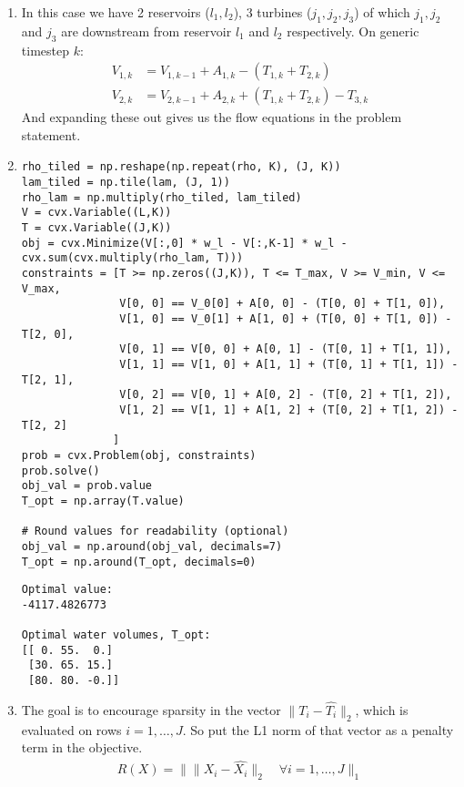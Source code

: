 \documentclass[11pt]{article}
\begin{document}
\begin{solution}
\begin{enumerate}
    \item In this case we have 2 reservoirs ($l_1, l_2$), 3 turbines ($j_1, j_2, j_3$) of which $j_1, j_2$ and $j_3$ are downstream from reservoir $l_1$ and $l_2$ respectively. On generic timestep $k$:
    \begin{align*}
        V_{1,k} &= V_{1,k-1} + A_{1,k} - (T_{1,k} + T_{2,k}) \\
        V_{2,k} &= V_{2,k-1} + A_{2,k} + (T_{1,k} + T_{2,k}) - T_{3,k}
    \end{align*}
    And expanding these out gives us the flow equations in the problem statement.

    \item
    \begin{verbatim}
rho_tiled = np.reshape(np.repeat(rho, K), (J, K))
lam_tiled = np.tile(lam, (J, 1))
rho_lam = np.multiply(rho_tiled, lam_tiled)
V = cvx.Variable((L,K))
T = cvx.Variable((J,K))
obj = cvx.Minimize(V[:,0] * w_l - V[:,K-1] * w_l - cvx.sum(cvx.multiply(rho_lam, T)))
constraints = [T >= np.zeros((J,K)), T <= T_max, V >= V_min, V <= V_max,
               V[0, 0] == V_0[0] + A[0, 0] - (T[0, 0] + T[1, 0]),
               V[1, 0] == V_0[1] + A[1, 0] + (T[0, 0] + T[1, 0]) - T[2, 0],
               V[0, 1] == V[0, 0] + A[0, 1] - (T[0, 1] + T[1, 1]),
               V[1, 1] == V[1, 0] + A[1, 1] + (T[0, 1] + T[1, 1]) - T[2, 1],
               V[0, 2] == V[0, 1] + A[0, 2] - (T[0, 2] + T[1, 2]),
               V[1, 2] == V[1, 1] + A[1, 2] + (T[0, 2] + T[1, 2]) - T[2, 2]
              ]
prob = cvx.Problem(obj, constraints)
prob.solve()
obj_val = prob.value
T_opt = np.array(T.value)

# Round values for readability (optional)
obj_val = np.around(obj_val, decimals=7)
T_opt = np.around(T_opt, decimals=0)
    \end{verbatim}
    \begin{verbatim}
Optimal value:
-4117.4826773

Optimal water volumes, T_opt:
[[ 0. 55.  0.]
 [30. 65. 15.]
 [80. 80. -0.]]
    \end{verbatim}

\item The goal is to encourage sparsity in the vector $\|T_i - \hat{T_i}\|_2$, which is evaluated on rows $i = 1, \dots, J$. So put the L1 norm of that vector as a penalty term in the objective.
    \begin{align*}
        R(X) = \|\|X_i - \hat{X_i}\|_2 \quad \forall i = 1, \dots, J\|_1
    \end{align*}


\end{enumerate}
\end{solution}
\end{document}
